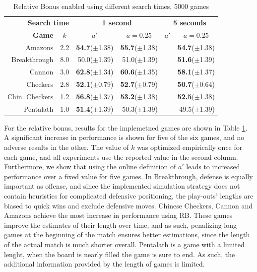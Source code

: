 \documentclass{ecai2014}
\begin{document}
\begin{table}
{\caption{Relative Bonus enabled using different search times, 5000 games} \label{tab:rb}}
\begin{center}
\begin{tabular}{rlrrrr}
\hline
\multicolumn{2}{r}{\rule{0pt}{12pt}\textbf{Search time}} & \multicolumn{2}{c}{\textbf{1 second}} & \multicolumn{2}{c}{\textbf{5 seconds}} \\
\cline{1-6}
\rule{0pt}{12pt}
\textbf{Game} & \multicolumn{1}{c|}{\textbf{$k$}} 
& \multicolumn{1}{c}{\textbf{$a'$}} & \multicolumn{1}{c}{\textbf{$a = 0.25$}} & \multicolumn{1}{c}{\textbf{$a'$}} & \multicolumn{1}{c}{\textbf{$a = 0.25$}} \\ \hline
Amazons &\multicolumn{1}{l|}{2.2}			& {\bf{54.7}}($\pm$1.38) & {\bf{55.7}}($\pm$1.38) 	& & {\bf{54.7}}($\pm$1.38) \\ 
Breakthrough &\multicolumn{1}{l|}{8.0} 		& 50.0($\pm$1.39)		 & 51.0($\pm$1.39) 			& & {\bf{51.6}}($\pm$1.39) \\ 
Cannon &\multicolumn{1}{l|}{3.0} 			& {\bf{62.8}}($\pm$1.34) & {\bf{60.6}}($\pm$1.35) 	& & {\bf{58.1}}($\pm$1.37) \\ 
Checkers &\multicolumn{1}{l|}{2.8}			& {\bf{52.1}}($\pm$0.79) & {\bf{52.7}}($\pm$0.79) 	& & {\bf{50.7}}($\pm$0.64) \\ 
Chin. Checkers &\multicolumn{1}{l|}{1.2} 	& {\bf{56.8}}($\pm$1.37) & {\bf{53.2}}($\pm$1.38) 	& & {\bf{52.5}}($\pm$1.38) \\
Pentalath &\multicolumn{1}{l|}{1.0} 		& {\bf{51.4}}($\pm$1.39) & 50.3($\pm$1.39) 			& & 49.5($\pm$1.39) \\
\hline
\end{tabular}
\end{center}
\end{table}
For the relative bonus, results for the implemetned games are shown in Table \ref{tab:rb}. A significant increase in performance is shown for five of the six games, and no adverse results in the other. The value of $k$ was optimized empirically once for each game, and all experiments use the reported value in the second column. Furthermore, we show that using the online definition of $a'$ leads to increased performance over a fixed value for five games. In Breakthrough, defense is equally important as offense, and since the implemented simulation strategy does not contain heuristics for complicated defensive positioning, the play-outs' lengths are biased to quick wins and exclude defensive moves.
Chinese Checkers, Cannon and Amazons achieve the most increase in performance using RB. These games improve the estimates of their length over time, and as such, penalizing long games at the beginning of the match ensures better estimations, since the length of the actual match is much shorter overall. Pentalath is a game with a limited lenght, when the board is nearly filled the game is sure to end. As such, the additional information provided by the length of games is limited.
\end{document}

